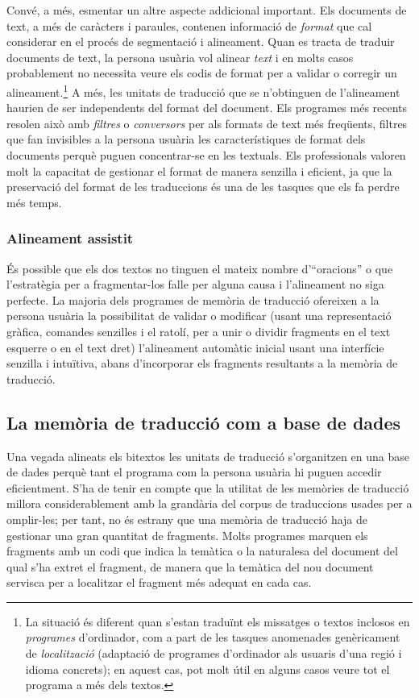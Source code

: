 Convé, a més, esmentar un altre aspecte addicional important. Els
documents de text, a més de caràcters i paraules, contenen informació
de \emph{format} que cal considerar en el procés de segmentació i
alineament.  Quan es tracta de traduir documents de text, la persona
usuària vol alinear \emph{text} i en molts casos probablement no
necessita veure els codis de format per a validar o corregir un
alineament.\footnote{La situació és diferent quan s'estan traduïnt els
  missatges o textos inclosos en \emph{programes} d'ordinador, com a
  part de les tasques anomenades genèricament de \emph{localització}
  (adaptació de programes d'ordinador als usuaris d'una regió i idioma
  concrets); en aquest cas, pot molt útil en alguns casos veure tot el
  programa a més dels textos.} A més, les unitats de traducció que
se n'obtinguen de l'alineament haurien de ser independents del format del
document. Els programes més recents resolen això amb \emph{filtres} o
\emph{conversors} per als formats de text més freqüents, filtres que
fan invisibles a la persona usuària les característiques de format
dels documents perquè puguen concentrar-se en les textuals. Els
professionals valoren molt la capacitat de gestionar el format de
manera senzilla i eficient, ja que la preservació del format de les
traduccions és una de les tasques que els fa perdre més temps.


\subsubsection{Alineament assistit}

És possible que els dos textos no tinguen el mateix nombre
d'``oracions'' o que l'estratègia per a fragmentar-los falle per
alguna causa i l'alineament no siga perfecte. La majoria dels
programes de memòria de traducció ofereixen a la persona usuària la
possibilitat de validar o modificar (usant una representació gràfica,
comandes senzilles i el ratolí, per a unir o dividir fragments en el
text esquerre o en el text dret) l'alineament automàtic inicial usant
una interfície senzilla i intuïtiva, abans d'incorporar els fragments
resultants a la memòria de traducció.


\subsection{La memòria de traducció com a base de dades}

Una vegada alineats els bitextos les unitats de traducció s'organitzen
en una base de dades perquè tant el programa com la persona usuària hi
puguen accedir eficientment. S'ha de tenir en compte que la utilitat
de les memòries de traducció millora considerablement amb la grandària
del corpus de traduccions usades per a omplir-les; per tant, no és
estrany que una memòria de traducció haja de gestionar una gran
quantitat de fragments. Molts programes marquen els fragments amb un
codi que indica la temàtica o la naturalesa del document del qual s'ha
extret el fragment, de manera que la temàtica del nou document
servisca per a localitzar el fragment més adequat en cada cas.

